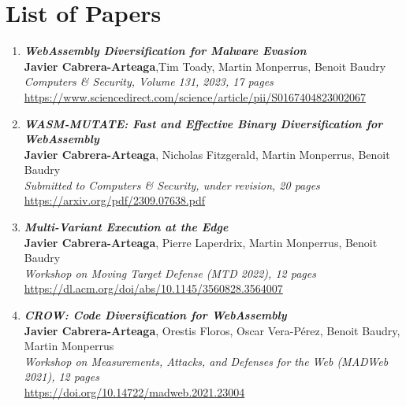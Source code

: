 
\chapter{List of Papers}

\vspace{1cm}
\begin{enumerate}[I]
    \item \textbf{\textit{WebAssembly Diversification for Malware Evasion}} \\
        \textbf{Javier Cabrera-Arteaga},Tim Toady, Martin Monperrus, Benoit Baudry\\
        \textit{Computers \& Security, Volume 131, 2023, 17 pages} \\
        \url{https://www.sciencedirect.com/science/article/pii/S0167404823002067}
    \item \textbf{\textit{WASM-MUTATE: Fast and Effective Binary Diversification for
    WebAssembly}} \\
        \textbf{Javier Cabrera-Arteaga}, Nicholas Fitzgerald, Martin Monperrus, Benoit Baudry\\
        \textit{Submitted to Computers \& Security, under revision, 20 pages} \\
        \url{https://arxiv.org/pdf/2309.07638.pdf}    
    \item \textbf{\textit{Multi-Variant Execution at the Edge}} \\
    \textbf{Javier Cabrera-Arteaga}, Pierre Laperdrix, Martin Monperrus, Benoit Baudry\\
    \textit{Workshop on Moving Target Defense (MTD 2022), 12 pages} \\
    \url{https://dl.acm.org/doi/abs/10.1145/3560828.3564007}

    \item \textbf{\textit{CROW: Code Diversification for WebAssembly}} \\
        \textbf{Javier Cabrera-Arteaga}, Orestis Floros, Oscar Vera-Pérez, Benoit Baudry, Martin Monperrus\\
        \textit{ Workshop on Measurements, Attacks, and Defenses for the Web (MADWeb 2021), 12 pages} \\
        \url{https://doi.org/10.14722/madweb.2021.23004}
    

\end{enumerate}
